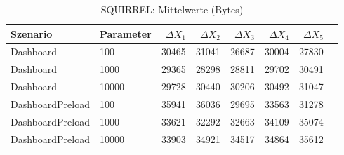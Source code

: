 
\begin{table}[ht]
\setlength{\extrarowheight}{-1pt}
\centering
\caption{SQUIRREL: Mittelwerte (Bytes)}
\begin{tabular}{llrrrrrr}
\toprule
Szenario & Parameter & ${\Delta \overline{X}_1}$ & ${\Delta \overline{X}_2}$ & ${\Delta \overline{X}_3}$ & ${\Delta \overline{X}_4}$ & ${\Delta \overline{X}_5}$ \\
\midrule
	Dashboard & 100 & 30465 & 31041 & 26687 & 30004 & 27830 \\
	Dashboard & 1000 & 29365 & 28298 & 28811 & 29702 & 30491 \\
	Dashboard & 10000 & 29728 & 30440 & 30206 & 30492 & 31047 \\
	DashboardPreload & 100 & 35941 & 36036 & 29695 & 33563 & 31278 \\
	DashboardPreload & 1000 & 33621 & 32292 & 32663 & 34109 & 35074 \\
	DashboardPreload & 10000 & 33903 & 34921 & 34517 & 34864 & 35612 \\
\bottomrule
\end{tabular}
\label{tab:mittelwerte_squirrel_bytes}
\end{table}
	